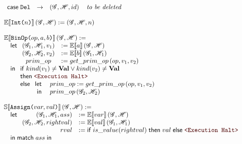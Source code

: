 \begin{figure}
\[\begin{array}[t]{l}
\begin{array}[t]{lclr}
      \casem{\SDel} &\to& \left(\Glo, \Hea, id\right) \quad \textit{to be deleted} \\
    \end{array}\\
    \\
    \Ctx{E}{\SLit{Int}{n}}\left(\Glo, \Hea\right) := \left(\Glo, \Hea, n\right) \\
    \\
    \Ctx{E}{\SLit{BinOp}{op, a, b}}\left(\Glo, \Hea\right) := \\
    \quad \letm
       \begin{array}[t]{cl}
          \left(\Glo_1, \Hea_1, v_1\right) &:= \Ctx{E}{a}\left(\Glo, \Hea\right) \\
          \left(\Glo_2, \Hea_2, v_2\right) &:= \Ctx{E}{b}\left(\Glo_1, \Hea_1\right) \\
          prim\_op &:= get\_prim\_op\left(op, v_1, v_2\right) \\
       \end{array} \\
    \quad \inm
       \begin{array}[t]{l}
         \ifm kind(v_1) \neq \mathbf{Val} \vee kind(v_2) \neq \mathbf{Val} \\
         \thenm \Halt \\
         \elsem
            \begin{array}[t]{rl}
              \letm& prim\_op := get\_prim\_op\left(op, v_1, v_2\right) \\
              \inm& prim\_op\left(\Glo_2, \Hea_2\right)
            \end{array} \\
       \end{array} \\
    \\
    \Ctx{S}{\SLit{Assign}{var, val}}\left(\Glo, \Hea\right) := \\
    \quad \letm
       \begin{array}[t]{rl}
          \left(\Glo_1, \Hea_1, ass\right) &:= \Ctx{E}{var}\left(\Glo, \Hea\right) \\
          \left(\Glo_2, \Hea_2, rightval\right) &:= \Ctx{E}{val}\left(\Glo_1, \Hea_1\right) \\
          rval &:= \ifm is\_value(rightval) \;\thenm val \;\elsem \Halt \\
       \end{array} \\
    \quad \inm \matchm{ass} \\

\end{array}\]
\end{figure}
